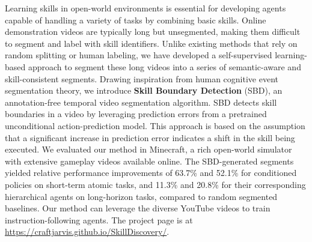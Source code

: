 Learning skills in open-world environments is essential for developing agents capable of handling a variety of tasks by combining basic skills.
Online demonstration videos are typically long but unsegmented, making them difficult to segment and label with skill identifiers.
Unlike existing methods that rely on random splitting or human labeling, we have developed a self-supervised learning-based approach to segment these long videos into a series of semantic-aware and skill-consistent segments.
Drawing inspiration from human cognitive event segmentation theory, we introduce \textbf{Skill Boundary Detection} (SBD), an annotation-free temporal video segmentation algorithm. SBD detects skill boundaries in a video by leveraging prediction errors from a pretrained unconditional action-prediction model. This approach is based on the assumption that a significant increase in prediction error indicates a shift in the skill being executed. 
We evaluated our method in Minecraft, a rich open-world simulator with extensive gameplay videos available online. The SBD-generated segments yielded relative performance improvements of 63.7\% and 52.1\% for conditioned policies on short-term atomic tasks, and 11.3\% and 20.8\% for their corresponding hierarchical agents on long-horizon tasks, compared to random segmented baselines.
Our method can leverage the diverse YouTube videos to train instruction-following agents.
The project page is at \href{https://craftjarvis.github.io/SkillDiscovery/}{https://craftjarvis.github.io/SkillDiscovery/}.